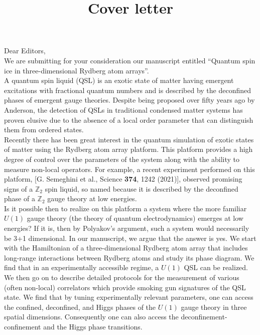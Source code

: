 \documentclass[12pt]{article}
\title{ \color{Burgundy} Cover letter}
\date{}
\begin{document}
\maketitle
{}


\noindent Dear Editors,\\

We are submitting for your consideration our manuscript entitled “Quantum spin ice in three-dimensional Rydberg atom arrays”.\\


A quantum spin liquid (QSL) is an exotic state of matter having emergent excitations with fractional quantum numbers and is described by the deconfined phases of emergent gauge theories. Despite being proposed over fifty years ago by Anderson, the detection of QSLs in traditional condensed matter systems has proven elusive due to the absence of a local order parameter that can distinguish them from ordered states. \\



Recently there has been great interest in the quantum simulation of exotic states of matter using the Rydberg atom array platform. This platform provides a high degree of control over the parameters of the system along with the ability to measure non-local operators. For example, a recent experiment performed on this platform, [G. Semeghini et al., Science \textbf{374}, 1242 (2021)], observed promising signs of a $\mathbb{Z}_2$ spin liquid, so named because it is described by the deconfined phase of a $\mathbb{Z}_2$ gauge theory at low energies.\\


Is it possible then to realize on this platform a system where the more familiar $U(1)$ gauge theory (the theory of quantum electrodynamics) emerges at low energies? If it is, then by Polyakov’s argument, such a system would necessarily be 3+1 dimensional. In our manuscript, we argue that the answer is yes. We start with the Hamiltonian of a three-dimensional Rydberg atom array that includes long-range interactions between Rydberg atoms and study its phase diagram. We find that in an experimentally accessible regime, a $U(1)$ QSL can be realized. We then go on to describe detailed protocols for the measurement of various (often non-local) correlators which provide smoking gun signatures of the QSL state. We find that by tuning experimentally relevant parameters, one can access the confined, deconfined, and Higgs phases of the $U(1)$ gauge theory in three spatial dimensions. Consequently one can also access the deconfinement-confinement and the Higgs phase transitions.\\
\end{document}
